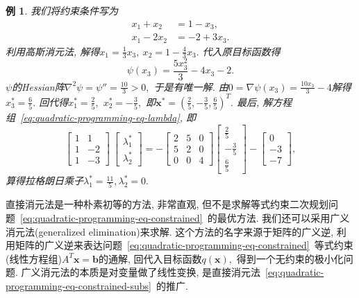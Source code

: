 \documentclass{SBCbookchapter}
\newcommand{\V}[1]{{\bm{#1}}}
\newtheorem{eg}[thm]{例}
\numberwithin{equation}{section}
\begin{document}
\begin{eg}
我们将约束条件写为
\begin{equation*}
\begin{aligned}
x_1 + x_2 & = 1 - x_3, \\
x_1 - 2x_2 & = -2 + 3x_3.
\end{aligned}
\end{equation*}
利用高斯消元法, 解得$x_1 = \frac{1}{3} x_3, ~ x_2 = 1 - \frac{4}{3} x_3.$ 代入原目标函数得
\begin{equation*}
\psi(x_3) = \frac{5 x_{3}^{2}}{3} - 4 x_{3} - 2.
\end{equation*}
$\psi$的Hessian阵$\nabla^2 \psi = \psi'' = \frac{10}{3} > 0,$ 于是有唯一解. 由$0 = \nabla \psi (x_3) = \frac{10 x_{3}}{3} - 4$解得$x_3^* = \frac{6}{5}.$ 回代得$x_1^* = \frac{2}{5},$ $x_2^* = -\frac{3}{5},$ 即$\V{x}^* = \left( \frac{2}{5}, -\frac{3}{5}, \frac{6}{5} \right)^T.$ 最后, 解方程组~\eqref{eq:quadratic-programming-eq-lambda}, 即
\begin{equation*}
\begin{bmatrix} 1 & 1 \\ 1 & -2 \\ 1 & -3 \end{bmatrix} ~ \begin{bmatrix} \lambda_1^* \\ \lambda_2^* \end{bmatrix} = - \begin{bmatrix} 2 & 5 & 0 \\ 5 & 2 & 0 \\ 0 & 0 & 4 \end{bmatrix} \begin{bmatrix} \frac{2}{5} \\ -\frac{3}{5} \\ \frac{6}{5} \end{bmatrix} - \begin{bmatrix} 0 \\ -3 \\ -7 \end{bmatrix},
\end{equation*}
算得拉格朗日乘子$\lambda_1^* = \frac{11}{5}, \lambda_2^* = 0.$
\end{eg}

直接消元法是一种朴素初等的方法, 非常直观, 但不是求解等式约束二次规划问题~\eqref{eq:quadratic-programming-eq-constrained}~的最优方法. 我们还可以采用广义消元法(generalized elimination)来求解. 这个方法的名字来源于矩阵的广义逆, 利用矩阵的广义逆来表达问题~\eqref{eq:quadratic-programming-eq-constrained}~等式约束(线性方程组)$A^T \V{x} = \V{b}$的通解, 回代入目标函数$q(\V{x}),$ 得到一个无约束的极小化问题. 广义消元法的本质是对变量做了线性变换, 是直接消元法~\eqref{eq:quadratic-programming-eq-constrained-subs}~的推广.
\end{document}
